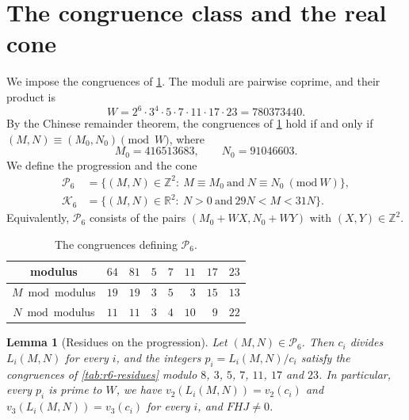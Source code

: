 \documentclass[12pt,oneside,openany]{book}
\theoremstyle{definition}
\theoremstyle{plain}
\numberwithin{equation}{chapter}
\theoremstyle{plain}
\newtheorem{lemma}[lemma]{Lemma}
\theoremstyle{definition}
\theoremstyle{remark}
\newcommand{\Z}{\mathbb Z}
\newcommand{\R}{\mathbb R}
\newcommand{\cP}{\mathcal P}
\newcommand{\cK}{\mathcal K}
\begin{document}
\section{The congruence class and the real cone}\label{sec:r6-progression}

We impose the congruences of \cref{tab:r6-crt}. The moduli are pairwise coprime, and their product is
\[
W=2^6\cdot3^4\cdot5\cdot7\cdot11\cdot17\cdot23=780373440.
\]
By the Chinese remainder theorem, the congruences of \cref{tab:r6-crt} hold if and only if $(M,N)\equiv(M_0,N_0)\pmod W$, where
\begin{equation}\label{r6:crt}
M_0=416513683,\qquad N_0=91046603.
\end{equation}
We define the progression and the cone
\begin{equation}\label{r6:cone}
\begin{aligned}
\cP_6&=\{(M,N)\in\Z^2:\ M\equiv M_0\ \text{and}\ N\equiv N_0\ (\mathrm{mod}\ W)\},\\
\cK_6&=\{(M,N)\in\R^2:\ N>0\ \text{and}\ 29N<M<31N\}.
\end{aligned}
\end{equation}
Equivalently, $\cP_6$ consists of the pairs $(M_0+WX,N_0+WY)$ with $(X,Y)\in\Z^2$.

\begin{table}[htbp]
\centering
\caption{The congruences defining $\cP_6$.}
\label{tab:r6-crt}
\begin{tabular}{crrrrrrr}
\toprule
modulus & $64$ & $81$ & $5$ & $7$ & $11$ & $17$ & $23$\\
\midrule
$M\bmod{}$modulus & $19$ & $19$ & $3$ & $5$ & $3$ & $15$ & $13$\\
$N\bmod{}$modulus & $11$ & $11$ & $3$ & $4$ & $10$ & $9$ & $22$\\
\bottomrule
\end{tabular}
\end{table}

\begin{lemma}[Residues on the progression]\label{lem:r6-residues}
Let $(M,N)\in\cP_6$. Then $c_i$ divides $L_i(M,N)$ for every $i$, and the integers $p_i=L_i(M,N)/c_i$ satisfy the congruences of \cref{tab:r6-residues} modulo $8$, $3$, $5$, $7$, $11$, $17$ and $23$. In particular, every $p_i$ is prime to $W$, we have $v_2(L_i(M,N))=v_2(c_i)$ and $v_3(L_i(M,N))=v_3(c_i)$ for every $i$, and $FHJ\ne0$.
\end{lemma}
\end{document}
